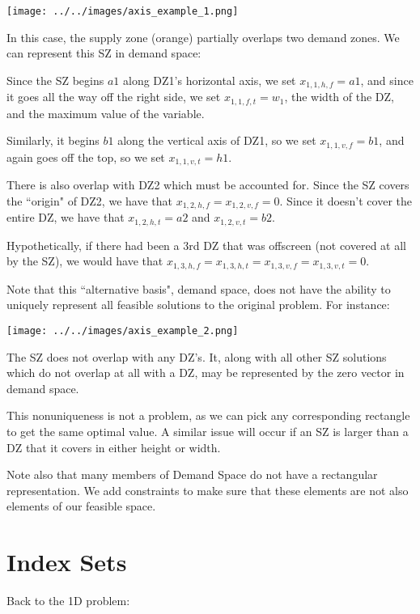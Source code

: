 \documentclass[a4paper]{article}
\begin{document}
 \texttt{[image: ../../images/axis\_example\_1.png]}
 
 In this case, the supply zone (orange) partially overlaps two demand zones. We can represent this SZ in demand space:
 
 Since the SZ begins $a1$ along DZ1's horizontal axis, we set $x_{1,1,h,f} = a1$, and since it goes all the way off the right side, we set $x_{1,1,f,t} = w_1$, the width of the DZ, and the maximum value of the variable. 
 
 Similarly, it begins $b1$ along the vertical axis of DZ1, so we set $x_{1,1,v,f} = b1$, and again goes off the top, so we set $x_{1,1,v,t} = h1$. 
 
 There is also overlap with DZ2 which must be accounted for. Since the SZ covers the ``origin" of DZ2, we have that $x_{1,2,h,f} = x_{1,2,v,f} = 0$. Since it doesn't cover the entire DZ, we have that $x_{1,2,h,t} = a2$ and $x_{1,2,v,t} = b2$.
 
 Hypothetically, if there had been a 3rd DZ that was offscreen (not covered at all by the SZ), we would have that $x_{1,3,h,f} = x_{1,3,h,t} = x_{1,3,v,f} = x_{1,3,v,t} = 0$.
 
 \vspace{1em}
 
 Note that this ``alternative basis", demand space, does not have the ability to uniquely represent all feasible solutions to the original problem. For instance:
 
 \texttt{[image: ../../images/axis\_example\_2.png]}
 
The SZ does not overlap with any DZ's. It, along with all other SZ solutions which do not overlap at all with a DZ, may be represented by the zero vector in demand space. 

This nonuniqueness is not a problem, as we can pick any corresponding rectangle to get the same optimal value. A similar issue will occur if an SZ is larger than a DZ that it covers in either height or width.
    
Note also that many members of Demand Space do not have a rectangular representation. We add constraints to make sure that these elements are not also elements of our feasible space.

\section{Index Sets}

Back to the 1D problem:
\end{document}
